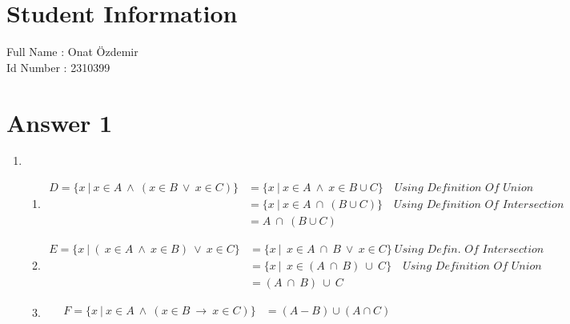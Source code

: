 \documentclass[11pt]{article}
\begin{document}
\section*{Student Information } 
Full Name : Onat Özdemir \\
Id Number : 2310399 \\

\section*{Answer 1}
\renewcommand{\theenumi}{\alph{enumi}}
\begin{enumerate}
	\item
\renewcommand{\theenumii}{\roman{enumii}}
\begin{enumerate}
	\item
	\begin{equation*} 
	\begin{split}
	D = \{x\ | \ x \in A \ \land \ (x \in B \ \lor \ x \in C)\} & = \{x\ | \ x \in A \ \land \ x \in B \cup C\} \quad \textit{Using Definition Of Union} \\
	& = \{x\ | \ x \in A \ \cap \  (B \cup C) \} \quad \textit{Using Definition Of Intersection} \\
	& = A \ \cap \  (B \cup C)
	\end{split}
	\end{equation*}
	
	\item
	\begin{equation*} 
	\begin{split}
	E = \{x\ | \ (\ x \in A \ \land \ x \in B) \ \lor \ x \in C\} & = \{x\ | \ \ x \in A \ \cap \ B \ \lor \ x \in C\} \ \textit{Using Defin. Of Intersection} \\
	& = \{x\ | \ \ x \in (A \ \cap \ B) \ \cup \ C\} \quad \textit{Using Definition Of Union} \\
	& = (A \ \cap \ B) \ \cup \ C
	\end{split}
	\end{equation*}
	
	\item
	\begin{equation*} 
	\begin{split}
	F = \{x\ | \ x \in A \ \land \ (x \in B \ \rightarrow \ x \in C)\} & = (A-B) \cup (A \cap C)  \\
	\end{split}
	\end{equation*}
	

\end{enumerate}
\end{enumerate}
\end{document}
